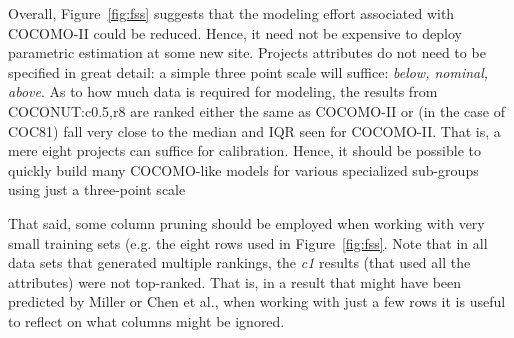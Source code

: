 \documentclass[smallcondesed]{svjour3}
\newcommand{\bi}{\begin{itemize}[leftmargin=0.4cm]}
\newcommand{\ei}{\end{itemize}}
\newcommand{\fig}[1]{Figure~\ref{fig:#1}}
\begin{document}
Overall, \fig{fss} suggests that the modeling
effort associated with COCOMO-II could be reduced. Hence,
it need not be expensive to deploy parametric estimation
at some new site.
Projects attributes
do not need to be specified in great detail:
a simple three point scale will suffice:
 {\em below, nominal, above}. As to how much data is
required for modeling, 
the results
from COCONUT:c0.5,r8 are ranked either the same as
COCOMO-II or (in the case of COC81) fall very close
to the median and IQR seen for COCOMO-II.
That is, 
a mere eight projects can
suffice for calibration.
Hence, it
should be possible to quickly build many COCOMO-like
models for various specialized sub-groups using just
a three-point scale

That said, some column pruning should be employed
when working with very small training sets (e.g.
the eight rows used in \fig{fss}. 
Note that
in all data sets that generated multiple rankings,
the {\em c1} results (that used all the attributes)
were not top-ranked. That is, in a result that might
have been predicted by Miller or Chen et al., when
working with just a few rows it is useful to
reflect on what columns might be ignored.






\end{document}
